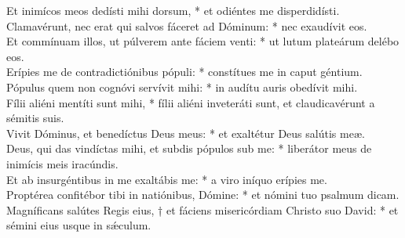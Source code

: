 {	Et inimícos meos dedísti mihi dorsum, * et odiéntes me disperdidísti. \\
	Clamavérunt, nec erat qui salvos fáceret ad Dóminum: * nec exaudívit eos. \\
	Et commínuam illos, ut púlverem ante fáciem venti: * ut lutum plateárum delébo eos. \\
	Erípies me de contradictiónibus pópuli: * constítues me in caput géntium. \\
	Pópulus quem non cognóvi servívit mihi: * in audítu auris obedívit mihi. \\
	Fílii aliéni mentíti sunt mihi, * fílii aliéni inveteráti sunt, et claudicavérunt a sémitis suis. \\
	Vivit Dóminus, et benedíctus Deus meus: * et exaltétur Deus salútis meæ. \\
	Deus, qui das vindíctas mihi, et subdis pópulos sub me: * liberátor meus de inimícis meis iracúndis. \\
	Et ab insurgéntibus in me exaltábis me: * a viro iníquo erípies me. \\
	Proptérea confitébor tibi in natiónibus, Dómine: * et nómini tuo psalmum dicam. \\
	Magníficans salútes Regis eius, † et fáciens misericórdiam Christo suo David: * et sémini eius usque in sǽculum.
}

